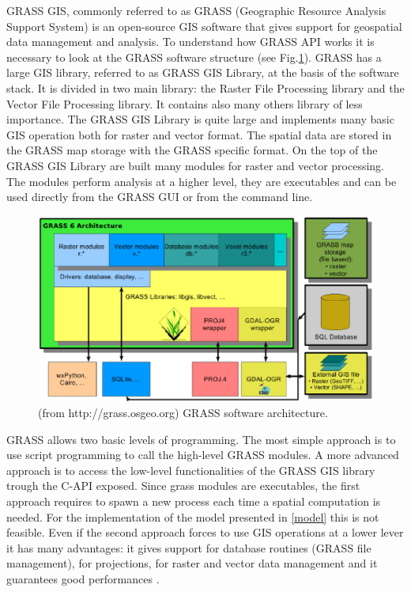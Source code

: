 \documentclass[12pt,a4paper,twoside]{book}
\begin{document}
GRASS GIS, commonly referred to as GRASS (Geographic Resource Analysis Support System) is an open-source GIS software that gives support for geospatial data management and analysis. To understand how GRASS API works it is necessary to look at the GRASS software structure (see Fig.\ref{grass_structure}). GRASS has a large GIS library, referred to as GRASS GIS Library, at the basis of the software stack. It is divided in two main library: the Raster File Processing library and the Vector File Processing library. It contains also many others library of less importance. The GRASS GIS Library is quite large and implements many basic GIS operation both for raster and vector format. The spatial data are stored in the GRASS map storage with the GRASS specific format. On the top of the GRASS GIS Library are built many modules for raster and vector processing. The modules perform analysis at a higher level, they are executables and can be used directly from the GRASS GUI or from the command line.

\begin{figure}
  \begin{center}
    \includegraphics[width=\textwidth]{images/grass6_arch.eps}
    \caption{(from http://grass.osgeo.org) GRASS software architecture.}\label{grass_structure}
  \end{center}
\end{figure}

GRASS allows two basic levels of programming. The most simple approach is to use script programming to call the high-level GRASS modules. A more advanced approach is to access the low-level functionalities of the GRASS GIS library trough the C-API exposed. Since grass modules are executables, the first approach requires to spawn a new process each time a spatial computation is needed. For the implementation of the model presented in \ref{model} this is not feasible. Even if the second approach forces to use GIS operations at a lower lever it has many advantages: it gives support for database routines (GRASS file management), for projections, for raster and  vector data management and it guarantees good performances \cite{net2008}.
\end{document}
